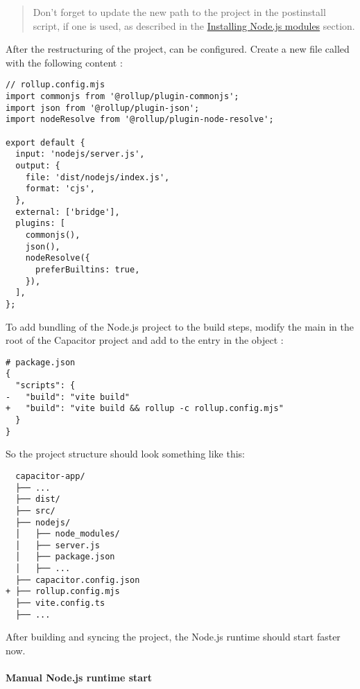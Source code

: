 \begin{quote}
  Don't forget to update the new path to the project in the postinstall script,
  if one is used, as described in the \hyperref[sec:Capacitor-NodeJS:InstallModules]{Installing Node.js modules} section. 
\end{quote}

\newpage

After the restructuring of the project,  can be configured.
Create a new file called  with the following content \cite{rollup, rollup-plugins}:

\begin{verbatim}
// rollup.config.mjs
import commonjs from '@rollup/plugin-commonjs';
import json from '@rollup/plugin-json';
import nodeResolve from '@rollup/plugin-node-resolve';

export default {
  input: 'nodejs/server.js',
  output: {
    file: 'dist/nodejs/index.js',
    format: 'cjs',
  },
  external: ['bridge'],
  plugins: [
    commonjs(),
    json(),
    nodeResolve({
      preferBuiltins: true,
    }),
  ],
}; 
\end{verbatim}

To add bundling of the Node.js project to the build steps, modify the main  in the root of the Capacitor project 
and add  to the  entry in the  object \cite{npm, rollup}:

\begin{verbatim}
# package.json
{
  "scripts": {
-   "build": "vite build"
+   "build": "vite build && rollup -c rollup.config.mjs"
  }
}
\end{verbatim}

So the project structure should look something like this:

\begin{verbatim}
  capacitor-app/
  ├── ...
  ├── dist/
  ├── src/
  ├── nodejs/
  │   ├── node_modules/
  │   ├── server.js
  │   ├── package.json
  │   ├── ...
  ├── capacitor.config.json
+ ├── rollup.config.mjs
  ├── vite.config.ts
  ├── ... 
\end{verbatim}

After building and syncing the project, the Node.js runtime should start faster now.

\newpage

\paragraph{Manual Node.js runtime start}
\label{sec:Capacitor-NodeJS:ManualRuntimeStart}

